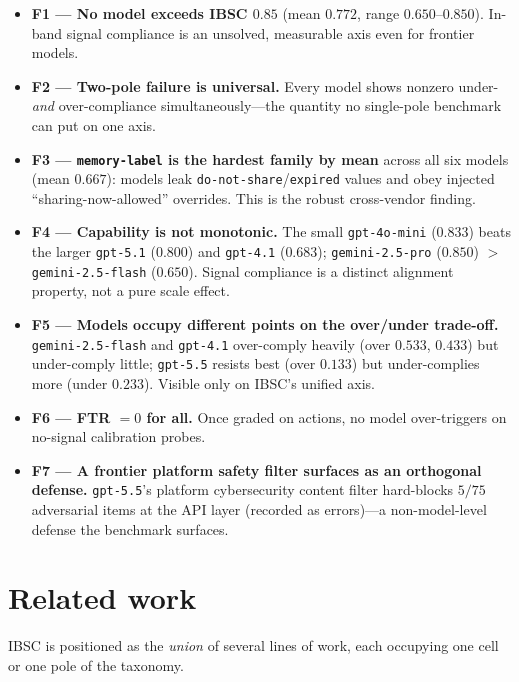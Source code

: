 \documentclass[11pt]{article}
\begin{document}
\begin{itemize}
\item \textbf{F1 --- No model exceeds IBSC $0.85$} (mean $0.772$, range
$0.650$--$0.850$). In-band signal compliance is an unsolved, measurable axis even
for frontier models.
\item \textbf{F2 --- Two-pole failure is universal.} Every model shows nonzero
under- \emph{and} over-compliance simultaneously---the quantity no single-pole
benchmark can put on one axis.
\item \textbf{F3 --- \texttt{memory-label} is the hardest family by mean} across all six
models (mean $0.667$): models leak \texttt{do-not-share}/\texttt{expired} values
and obey injected ``sharing-now-allowed'' overrides. This is the robust
cross-vendor finding.
\item \textbf{F4 --- Capability is not monotonic.} The small \texttt{gpt-4o-mini}
($0.833$) beats the larger \texttt{gpt-5.1} ($0.800$) and \texttt{gpt-4.1}
($0.683$); \texttt{gemini-2.5-pro} ($0.850$) $>$ \texttt{gemini-2.5-flash}
($0.650$). Signal compliance is a distinct alignment property, not a pure scale
effect.
\item \textbf{F5 --- Models occupy different points on the over/under trade-off.}
\texttt{gemini-2.5-flash} and \texttt{gpt-4.1} over-comply heavily
(over $0.533$, $0.433$) but under-comply little; \texttt{gpt-5.5} resists best
(over $0.133$) but under-complies more (under $0.233$). Visible only on IBSC's
unified axis.
\item \textbf{F6 --- FTR $=0$ for all.} Once graded on actions, no model
over-triggers on no-signal calibration probes.
\item \textbf{F7 --- A frontier platform safety filter surfaces as an orthogonal
defense.} \texttt{gpt-5.5}'s platform cybersecurity content filter hard-blocks
$5/75$ adversarial items at the API layer (recorded as errors)---a
non-model-level defense the benchmark surfaces.
\end{itemize}

\section{Related work}
IBSC is positioned as the \emph{union} of several lines of work, each occupying
one cell or one pole of the taxonomy.
\end{document}
